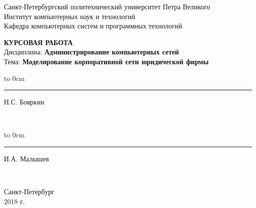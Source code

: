 	\begin{titlepage}
		\begin{center}
			\large {Санкт-Петербургский политехнический университет Петра Великого\\
				Институт компьютерных наук и технологий}\\
				Кафедра компьютерных систем и программных технологий
		\end{center}

		\vfill
		\begin{center}
			\large{\textbf{КУРСОВАЯ РАБОТА} \\ \vspace*{2cm}
			Дисциплина: \textbf{Администрирование компьютерных сетей}\\
			Тема: \textbf{Моделирование корпоративной сети юридической фирмы}}
		\end{center}
		
		\vfill
		
		\hfill\parbox{9 cm}{\hspace*{3cm}\hbox to 0cm{\raisebox{-1em}{\small(подпись)}}\hspace*{-0.8cm}\rule{3cm}{0.8pt} Н.С. Бояркин}\\[0.6cm]
		
		 \hfill\parbox{9 cm}{\hspace*{3cm}\hbox to 0cm{\raisebox{-1em}{\small(подпись)}}\hspace*{-0.8cm}\rule{3cm}{0.8pt} И.А. Малышев}\\[0.6cm]
		
		\vspace{\fill}
		\begin{center}
			Санкт-Петербург \\ 2018 г.
		\end{center}
	\end{titlepage}
\setcounter{page}{3}